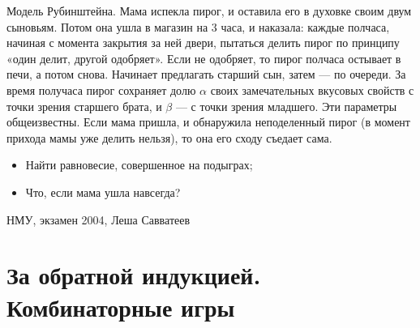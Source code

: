 \begin{problem}
Модель Рубинштейна. Мама испекла пирог, и оставила его в духовке своим двум сыновьям. Потом она ушла в магазин на 3 часа, и наказала: каждые полчаса, начиная с момента закрытия за ней двери, пытаться делить пирог по принципу «один делит, другой одобряет». Если не одобряет, то пирог полчаса остывает в печи, а потом снова. Начинает предлагать старший сын, затем — по очереди. За время получаса пирог сохраняет долю $\alpha$ своих замечательных вкусовых свойств с точки зрения старшего брата, и $\beta$ — с точки зрения младшего. Эти параметры общеизвестны. Если мама пришла, и обнаружила неподеленный пирог (в момент прихода мамы уже делить нельзя), то она его сходу съедает сама.
\begin{itemize}
\item Найти равновесие, совершенное на подыграх;
\item Что, если мама ушла навсегда?
\end{itemize}



\begin{source}
НМУ, экзамен 2004, Леша Савватеев
\end{source}


\begin{sol}

\end{sol}
\end{problem}






\section{За обратной индукцией. Комбинаторные игры}

